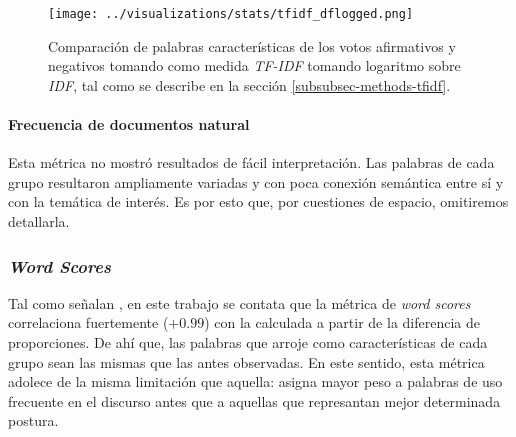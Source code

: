 \begin{figure}[h!]
    \centering
    \texttt{[image: ../visualizations/stats/tfidf\_dflogged.png]}
    \caption{Comparación de palabras características de los votos afirmativos y
    negativos tomando como medida \textit{TF-IDF} tomando logaritmo
    sobre \textit{IDF}, tal como se describe en la sección
    \ref{subsubsec-methods-tfidf}.}
    \label{fig-statistics-wordscores}
\end{figure}


\paragraph{Frecuencia de documentos natural}
Esta métrica no mostró resultados de fácil interpretación. Las palabras de cada
grupo resultaron ampliamente variadas y con poca conexión semántica
entre sí y con la temática de interés. Es por esto que, por cuestiones de espacio,
omitiremos detallarla.

\subsubsection{\textit{Word Scores}}

Tal como señalan \cite{monroe2008fightin}, en este trabajo se contata que
la métrica de \textit{word scores} correlaciona fuertemente ($+0.99$) con
la calculada a partir de la diferencia de proporciones. De ahí que, las palabras
que arroje como características de cada grupo sean las mismas que las antes
observadas. En este sentido, esta métrica adolece de la misma limitación
que aquella: asigna mayor peso a palabras de uso frecuente en el discurso antes
que a aquellas que represantan mejor determinada postura.
